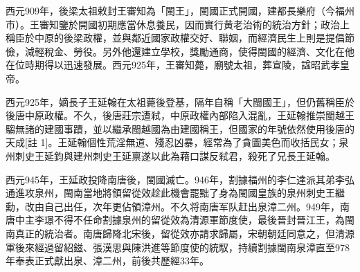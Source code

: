 西元909年，後梁太祖敕封王審知為「閩王」，閩國正式開國，建都長樂府（今福州市）。王審知鑒於開國初期應當休息養民，因而實行黄老治術的統治方針；政治上稱臣於中原的後梁政權，並與鄰近國家政權交好、聯姻，而經濟民生上則是提倡節儉，減輕稅金、勞役。另外他還建立學校，獎勵通商，使得閩國的經濟、文化在他在位時期得以迅速發展。西元925年，王審知薨，廟號太祖，葬宣陵，諡昭武孝皇帝。

西元925年，嫡長子王延翰在太祖薨後登基，隔年自稱「大閩國王」，但仍舊稱臣於後唐中原政權。不久，後唐莊宗遭弒，中原政權內部陷入混亂，王延翰推崇閩越王騶無諸的建國事蹟，並以繼承閩越國為由建國稱王，但國家的年號依然使用後唐的天成[註 1]。王延翰個性荒淫無道、殘忍凶暴，經常為了貪圖美色而收括民女；泉州刺史王延鈞與建州刺史王延禀遂以此為藉口謀反弒君，殺死了兄長王延翰。

西元945年，王延政投降南唐後，閩國滅亡。946年，割據福州的李仁達派其弟李弘通進攻泉州，閩南當地將領留從效趁此機會罷黜了身為閩國皇族的泉州刺史王繼勳，改由自己出任，次年更佔領漳州。不久将南唐军队赶出泉漳二州。949年，南唐中主李璟不得不任命割據泉州的留從效為清源軍節度使，最後晉封晉江王，為閩南真正的統治者。南唐歸降北宋後，留從效亦請求歸屬，宋朝朝廷同意之，但清源軍後來經過留紹鎡、張漢思與陳洪進等節度使的統馭，持續割據閩南泉漳直至978年奉表正式獻出泉、漳二州，前後共歷經33年。










